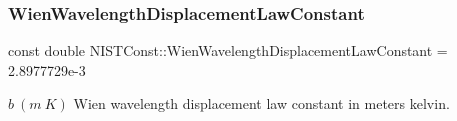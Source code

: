 \subsubsection{\texorpdfstring{Wien\+Wavelength\+Displacement\+Law\+Constant}{WienWavelengthDisplacementLawConstant}}
{\footnotesize\ttfamily const double N\+I\+S\+T\+Const\+::\+Wien\+Wavelength\+Displacement\+Law\+Constant = 2.\+8977729e-\/3}

$b \ (m\ K)$ Wien wavelength displacement law constant in meters kelvin. 